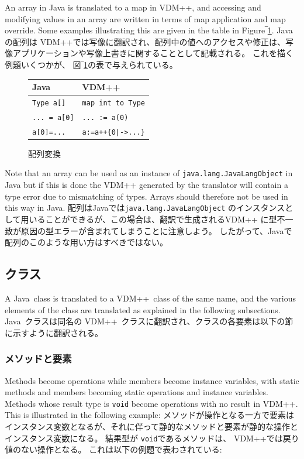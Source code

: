 \documentclass[\pformat,12pt]{jarticle}
\newcommand{\JAVA}{Java}
\newcommand{\VDM}{VDM++}
\begin{document}
An array in Java is translated to a map in VDM++, and accessing and
modifying values in an array are written in terms of map application
and map override. Some examples illustrating this are given in
the table in Figure‾\ref{fig:arrayxfs}. 
Javaの配列は VDM++では写像に翻訳され、配列中の値へのアクセスや修正は、写像アプリケーションや写像上書きに関することとして記載される。
これを描く例題いくつかが、 図‾\ref{fig:arrayxfs}の表で与えられている。
\newpage
\begin{figure}[htbp]
  \begin{center}
\begin{longtable}{|l|l|}
\hline
  \JAVA\   & \VDM\ \\ \hline \hline
  \texttt{Type a[]}   & \texttt{map int to Type} \\ \hline
  \texttt{... = a[0]}   & \texttt{... := a(0)} \\ \hline
  \texttt{a[0]=...}   & \texttt{a:=a++\{0|->...\}} \\ \hline
\end{longtable}    
    \caption{配列変換}
    \label{fig:arrayxfs}
  \end{center}
\end{figure}

Note that an array can be used as an instance of
\texttt{java.lang.JavaLangObject} in Java but if this is done the
VDM++ generated by the translator will contain a type error due to
mismatching of types. Arrays should therefore not be used in this way
in Java. 
配列はJavaでは\texttt{java.lang.JavaLangObject} のインスタンスとして用いることができるが、この場合は、翻訳で生成されるVDM++ に型不一致が原因の型エラーが含まれてしまうことに注意しよう。
したがって、Javaで配列のこのような用い方はすべきではない。

\subsection{クラス}\label{class}

A \JAVA\ class is translated to a \VDM\ class of the same name, and
the various elements of the class are translated as explained in the
following subsections.
 \JAVA\ クラスは同名の \VDM\ クラスに翻訳され、クラスの各要素は以下の節に示すように翻訳される。

\subsubsection{メソッドと要素}\label{methods}

Methods become operations while members become instance variables,
with static methods and members becoming static operations and 
instance variables. Methods whose result type is \texttt{void}
become operations with no result in VDM++. This is illustrated in
the following example:  
メソッドが操作となる一方で要素はインスタンス変数となるが、それに伴って静的なメソッドと要素が静的な操作とインスタンス変数になる。
結果型が \texttt{void}であるメソッドは、 VDM++では戻り値のない操作となる。
これは以下の例題で表わされている:  
\end{document}
